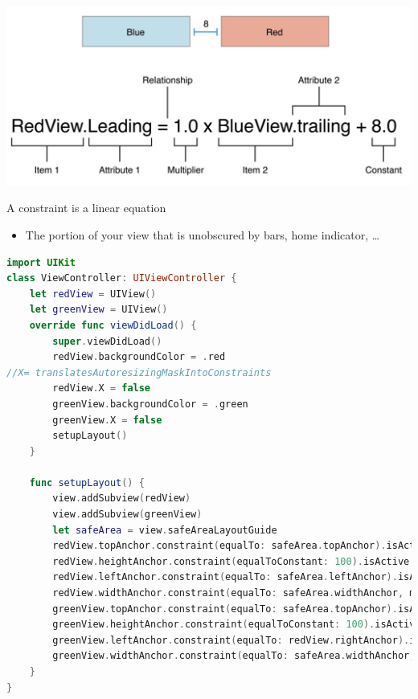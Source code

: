 \begin{breakbox}

\includegraphics[width=.15\textwidth]{figures/constraint.png}

A constraint is a linear equation
\end{breakbox}

\begin{breakbox}

\begin{itemize}
\tightlist
\item
  The portion of your view that is unobscured by bars, home indicator,
  \ldots{}
\end{itemize}
\end{breakbox}

\begin{breakbox}


\begin{lstlisting}[language=swift]
import UIKit
class ViewController: UIViewController {
    let redView = UIView()
    let greenView = UIView()
    override func viewDidLoad() {
        super.viewDidLoad()
        redView.backgroundColor = .red
//X= translatesAutoresizingMaskIntoConstraints
        redView.X = false
        greenView.backgroundColor = .green
        greenView.X = false
        setupLayout()
    }

    func setupLayout() {
        view.addSubview(redView)
        view.addSubview(greenView)
        let safeArea = view.safeAreaLayoutGuide
        redView.topAnchor.constraint(equalTo: safeArea.topAnchor).isActive = true
        redView.heightAnchor.constraint(equalToConstant: 100).isActive = true
        redView.leftAnchor.constraint(equalTo: safeArea.leftAnchor).isActive = true
        redView.widthAnchor.constraint(equalTo: safeArea.widthAnchor, multiplier: 0.5).isActive = true
        greenView.topAnchor.constraint(equalTo: safeArea.topAnchor).isActive = true
        greenView.heightAnchor.constraint(equalToConstant: 100).isActive = true
        greenView.leftAnchor.constraint(equalTo: redView.rightAnchor).isActive = true
        greenView.widthAnchor.constraint(equalTo: safeArea.widthAnchor, multiplier: 0.5).isActive = true
    }
}
\end{lstlisting}
\end{breakbox}

